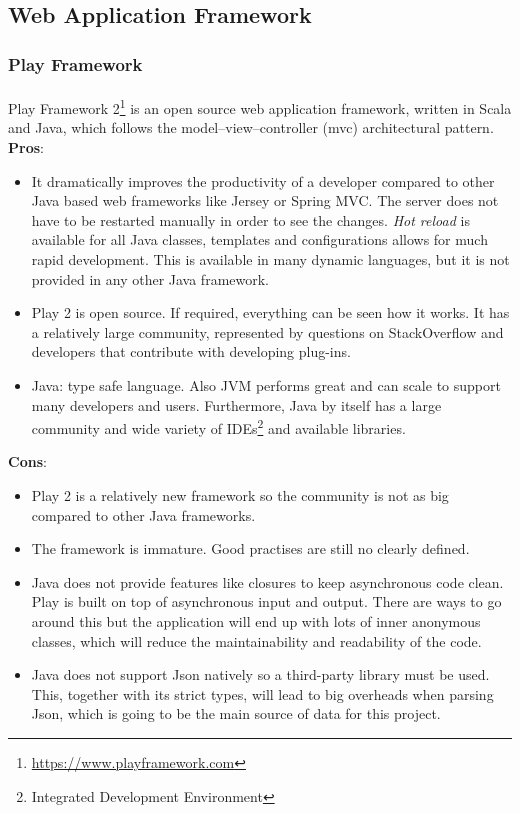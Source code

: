 \documentclass{l4proj}
\begin{document}
\subsection{Web Application Framework}

\subsubsection{Play Framework}
\paragraph{}
Play Framework 2\footnote{\url{https://www.playframework.com}} is an open source web application framework, written in Scala and Java, which follows the model–view–controller (mvc) architectural pattern. 
\\ \textbf{Pros}:
\begin{itemize}

\item It dramatically improves the productivity of a developer compared to other Java based web frameworks like Jersey or Spring MVC. The server does not have to be restarted manually in order to see the changes. \textit{Hot reload} is available for all Java classes, templates and configurations allows for much rapid development. This is available in many dynamic languages, but it is not provided in any other Java framework.

\item Play 2 is open source. If required, everything can be seen how it works. It has a relatively large community, represented by questions on StackOverflow and developers that contribute with developing plug-ins.

\item Java: type safe language. Also JVM performs great and can scale to support many developers and users. Furthermore, Java by itself has a large community and 
wide variety of IDEs\footnote{Integrated Development Environment} and available libraries.
	
\end{itemize}
\textbf{Cons}:
\begin{itemize}
\item Play 2 is a relatively new framework so the community is not as big compared to other Java frameworks. 

\item The framework is immature. Good practises are still no clearly defined. 

\item Java does not provide features like closures to keep asynchronous code clean. Play is built on top of asynchronous input and output. There are ways to go around this but the application will end up with lots of inner anonymous classes, which will reduce the maintainability and readability of the code.

\item Java does not support Json natively so a third-party library must be used. This, together with its strict types, will lead to big overheads when parsing Json, which 
is going to be the main source of data for this project.  
\end{itemize}
\end{document}
